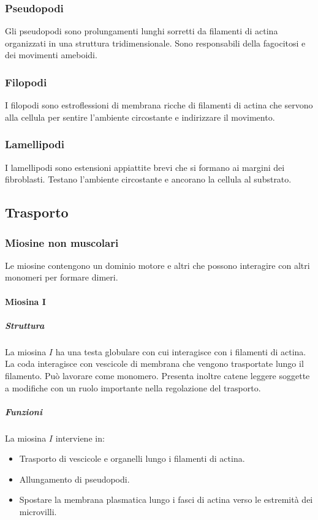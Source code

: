 		\subsubsection{Pseudopodi}
		Gli pseudopodi sono prolungamenti lunghi sorretti da filamenti di actina organizzati in una struttura tridimensionale.
		Sono responsabili della fagocitosi e dei movimenti ameboidi.

		\subsubsection{Filopodi}
		I filopodi sono estroflessioni di membrana ricche di filamenti di actina che servono alla cellula per sentire l'ambiente circostante e indirizzare il movimento.

		\subsubsection{Lamellipodi}
		I lamellipodi sono estensioni appiattite brevi che si formano ai margini dei fibroblasti.
		Testano l'ambiente circostante e ancorano la cellula al substrato.

	\subsection{Trasporto}

		\subsubsection{Miosine non muscolari}
		Le miosine contengono un dominio motore e altri che possono interagire con altri monomeri per formare dimeri.

			\paragraph{Miosina $\mathbf{I}$}

				\subparagraph{Struttura}
				La miosina $I$ ha una testa globulare con cui interagisce con i filamenti di actina.
				La coda interagisce con vescicole di membrana che vengono trasportate lungo il filamento.
				Pu\`o lavorare come monomero.
				Presenta inoltre catene leggere soggette a modifiche con un ruolo importante nella regolazione del trasporto.

				\subparagraph{Funzioni}
				La miosina $I$ interviene in:
				\begin{multicols}{2}
					\begin{itemize}
						\item Trasporto di vescicole e organelli lungo i filamenti di actina.
						\item Allungamento di pseudopodi.
						\item Spostare la membrana plasmatica lungo i fasci di actina verso le estremit\`a dei microvilli.
					\end{itemize}
				\end{multicols}

